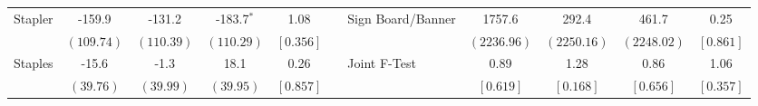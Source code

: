\begin{tabular}{lccccclcccc}
 \multirow{2}{*}{Stapler}  & -159.9 & -131.2 & -183.7$^{*}$ &   1.08 & & \multirow{2}{*}{Sign Board/Banner}  & 1757.6 &  292.4 &  461.7 &   0.25 \\ 
 & $ \left(109.74\right) $  & $ \left(110.39\right) $  & $ \left(110.29\right) $  & $ \left[ 0.356\right] $  & &  & $ \left(2236.96\right) $  & $ \left(2250.16\right) $  & $ \left(2248.02\right) $  & $ \left[ 0.861\right] $  \\ [0.25em] 
\cmidrule(lr){7-11}  \multirow{2}{*}{Staples}  &  -15.6 &   -1.3 &   18.1 &   0.26 & & \multirow{2}{*}{Joint F-Test}  &   0.89 &   1.28 &   0.86 &   1.06 \\ 
 & $ \left( 39.76\right) $  & $ \left( 39.99\right) $  & $ \left( 39.95\right) $  & $ \left[ 0.857\right] $  & &  & $ \left[ 0.619 \right] $  & $ \left[ 0.168 \right] $  & $ \left[ 0.656 \right] $  & $ \left[ 0.357\right] $ \\ [0.25em]
 \bottomrule 
 \end{tabular}
